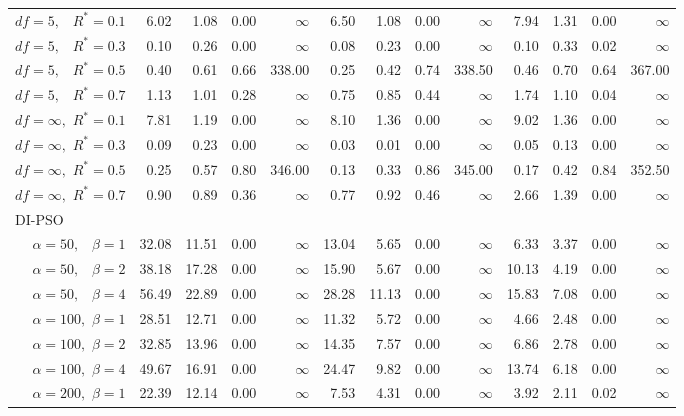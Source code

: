 \documentclass[cmbright]{staauth}
\begin{document}
\begin{table}[ht]
{\begin{tabular}{r|rrrr|rrrr|rrrr}
  $df = 5,\enspace$ $R^* =0.1$ & 6.02 & 1.08 & 0.00 & $\infty$ & 6.50 & 1.08 & 0.00 & $\infty$ & 7.94 & 1.31 & 0.00 & $\infty$ \\
  $df = 5,\enspace$ $R^* =0.3$ & 0.10 & 0.26 & 0.00 & $\infty$ & 0.08 & 0.23 & 0.00 & $\infty$ & 0.10 & 0.33 & 0.02 & $\infty$ \\
  $df = 5,\enspace$ $R^* =0.5$ & 0.40 & 0.61 & 0.66 & 338.00 & 0.25 & 0.42 & 0.74 & 338.50 & 0.46 & 0.70 & 0.64 & 367.00 \\
  $df = 5,\enspace$ $R^* =0.7$ & 1.13 & 1.01 & 0.28 & $\infty$ & 0.75 & 0.85 & 0.44 & $\infty$ & 1.74 & 1.10 & 0.04 & $\infty$ \\
  $df = \infty,$ $R^* =0.1$ & 7.81 & 1.19 & 0.00 & $\infty$ & 8.10 & 1.36 & 0.00 & $\infty$ & 9.02 & 1.36 & 0.00 & $\infty$ \\
  $df = \infty,$ $R^* =0.3$ & 0.09 & 0.23 & 0.00 & $\infty$ & 0.03 & 0.01 & 0.00 & $\infty$ & 0.05 & 0.13 & 0.00 & $\infty$ \\
  $df = \infty,$ $R^* =0.5$ & 0.25 & 0.57 & 0.80 & 346.00 & 0.13 & 0.33 & 0.86 & 345.00 & 0.17 & 0.42 & 0.84 & 352.50 \\
  $df = \infty,$ $R^* =0.7$ & 0.90 & 0.89 & 0.36 & $\infty$ & 0.77 & 0.92 & 0.46 & $\infty$ & 2.66 & 1.39 & 0.00 & $\infty$ \\
\hline
\multicolumn{1}{l|}{DI-PSO} &&&&&&&&&&&&\\
  $\alpha = 50,\enspace$ $\beta =1$ & 32.08 & 11.51 & 0.00 & $\infty$ & 13.04 & 5.65 & 0.00 & $\infty$ & 6.33 & 3.37 & 0.00 & $\infty$ \\
  $\alpha = 50,\enspace$ $\beta =2$ & 38.18 & 17.28 & 0.00 & $\infty$ & 15.90 & 5.67 & 0.00 & $\infty$ & 10.13 & 4.19 & 0.00 & $\infty$ \\
  $\alpha = 50,\enspace$ $\beta =4$ & 56.49 & 22.89 & 0.00 & $\infty$ & 28.28 & 11.13 & 0.00 & $\infty$ & 15.83 & 7.08 & 0.00 & $\infty$ \\
  $\alpha = 100,$ $\beta =1$ & 28.51 & 12.71 & 0.00 & $\infty$ & 11.32 & 5.72 & 0.00 & $\infty$ & 4.66 & 2.48 & 0.00 & $\infty$ \\
  $\alpha = 100,$ $\beta =2$ & 32.85 & 13.96 & 0.00 & $\infty$ & 14.35 & 7.57 & 0.00 & $\infty$ & 6.86 & 2.78 & 0.00 & $\infty$ \\
  $\alpha = 100,$ $\beta =4$ & 49.67 & 16.91 & 0.00 & $\infty$ & 24.47 & 9.82 & 0.00 & $\infty$ & 13.74 & 6.18 & 0.00 & $\infty$ \\
  $\alpha = 200,$ $\beta =1$ & 22.39 & 12.14 & 0.00 & $\infty$ & 7.53 & 4.31 & 0.00 & $\infty$ & 3.92 & 2.11 & 0.02 & $\infty$ \\

\end{tabular}}
\end{table}
\end{document}
